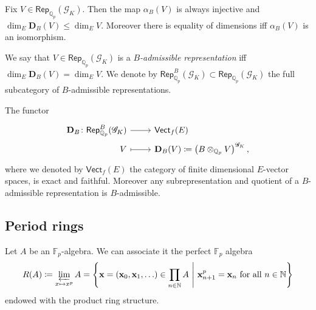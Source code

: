 \begin{prop}
	Fix $V \in \mathsf{Rep}_{\mathbb{Q}_p}(\mathscr{G}_K)$.
	Then the map $\alpha_B(V)$ is always injective and
	$\dim_E \mathbf{D}_B(V) \leq \dim_E V$.
	Moreover there is equality of dimensions iff $\alpha_B(V)$ is an isomorphism.
\end{prop}


\begin{defn}
	We say that $V \in \mathsf{Rep}_{\mathbb{Q}_p}(\mathscr{G}_K)$ is a
	{\em $B$-admissible representation} iff 
	$\dim_E \mathbf{D}_B(V) = \dim_E V$.
	We denote by $\mathsf{Rep}_{\mathbb{Q}_p}^B(\mathscr{G}_K) \subset
	\mathsf{Rep}_{\mathbb{Q}_p}(\mathscr{G}_K)$
	the full subcategory of $B$-admissible representations.
\end{defn}


\begin{prop}
	The functor
	\begin{equation*}
	\begin{tikzcd}[row sep = 0ex
		,/tikz/column 1/.append style={anchor=base east}
		,/tikz/column 2/.append style={anchor=base west}]
		\mathbf{D}_B\colon \mathsf{Rep}_{\mathbb{Q}_p}^B(\mathscr{G}_K) \arrow[r, "", rightarrow] &
		\mathsf{Vect}_f(E) \\
		V \arrow[r, "", mapsto] & 
		\mathbf{D}_B(V) \coloneqq \left( B \otimes_{\mathbb{Q}_p} V \right)^{\mathscr{G}_K}
	,\end{tikzcd}
	\end{equation*} 
	where we denoted by $\mathsf{Vect}_f(E)$ the category of finite dimensional $E$-vector spaces,
	is exact and faithful.
	Moreover any subrepresentation and quotient of a $B$-admissible
	representation is $B$-admissible.
\end{prop}



\subsection{Period rings}
\begin{defn}[]
	Let $A$ be an $\mathbb{F}_p$-algebra.
	We can associate it the perfect $\mathbb{F}_p$ algebra
	\begin{equation*}
		R(A) \coloneqq \varprojlim_{x \mapsto x^p} A =
		\left\{ \mathbf{x} = \left( \mathbf{x}_0, \mathbf{x}_1, \ldots \right) 
			\in \prod_{n \in \mathbb{N}} A
		\ \middle|\ \mathbf{x}_{n+1}^p = \mathbf{x}_n \text{ for all } n \in \mathbb{N} \right\}
	\end{equation*}
	endowed with the product ring structure.
\end{defn}


